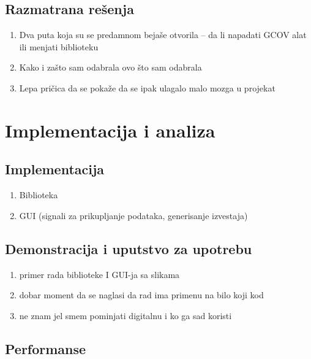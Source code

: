 \documentclass[12pt,oneside]{memoir}
\begin{document}
\section{Razmatrana rešenja}

\begin{enumerate}
\item Dva puta koja su se predamnom bejaše otvorila – da li napadati GCOV alat ili menjati biblioteku
\item Kako i zašto sam odabrala ovo što sam odabrala
\item Lepa pričica da se pokaže da se ipak ulagalo malo mozga u projekat
\end{enumerate}


\chapter{Implementacija i analiza}
\label{chp:sprovodenje}

\section{Implementacija}

\begin{enumerate}
\item Biblioteka
\item GUI (signali za prikupljanje podataka, generisanje izvestaja)
\end{enumerate}

\section{Demonstracija i uputstvo za upotrebu}

\begin{enumerate}
\item primer rada biblioteke I GUI-ja sa slikama
\item dobar moment da se naglasi da rad ima primenu na bilo koji kod
\item ne znam jel smem pominjati digitalnu i ko ga sad koristi
\end{enumerate}

\section{Performanse}
\end{document}
